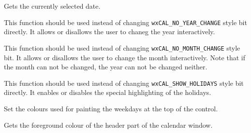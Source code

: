 
Gets the currently selected date.

\label{wxcalendarctrlenableyearchange}


This function should be used instead of changing {\tt wxCAL\_NO\_YEAR\_CHANGE}
style bit directly. It allows or disallows the user to chaneg the year
interactively.

\label{wxcalendarctrlenablemonthchange}


This function should be used instead of changing 
{\tt wxCAL\_NO\_MONTH\_CHANGE} style bit. It allows or disallows the user to
change the month interactively. Note that if the month can not be changed, the
year can not be changed neither.

\label{wxcalendarctrlenableholidaydisplay}


This function should be used instead of changing {\tt wxCAL\_SHOW\_HOLIDAYS}
style bit directly. It enables or disables the special highlighting of the
holidays.

\label{wxcalendarctrlsetheadercolours}


Set the colours used for painting the weekdays at the top of the control.

\label{wxcalendarctrlgetheadercolourfg}


Gets the foreground colour of the header part of the calendar window.



\label{wxcalendarctrlgetheadercolourbg}


